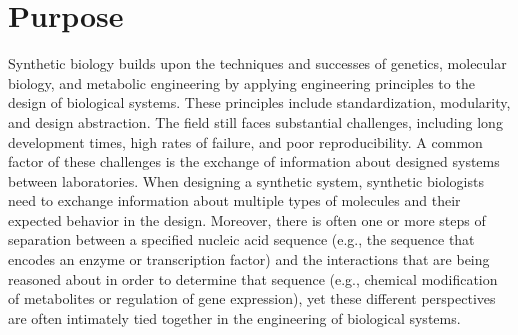 \section{Purpose}


Synthetic biology builds upon the techniques and successes of genetics, molecular biology, and metabolic engineering by applying engineering principles to the design of biological systems. These principles include standardization, modularity, and design abstraction. The field still faces substantial challenges, including long development times, high rates of failure, and poor reproducibility. A common factor of these challenges is the exchange of information about designed systems between laboratories. 
When designing a synthetic system,  synthetic biologists need to exchange information about multiple types of molecules and their expected behavior in the design.
Moreover, there is often one or more steps of separation between a specified nucleic acid sequence (e.g., the sequence that encodes an enzyme or transcription factor) and the interactions that are being reasoned about in order to determine that sequence (e.g., chemical modification of metabolites or regulation of gene expression), yet these different perspectives are often intimately tied together in the engineering of biological systems.

